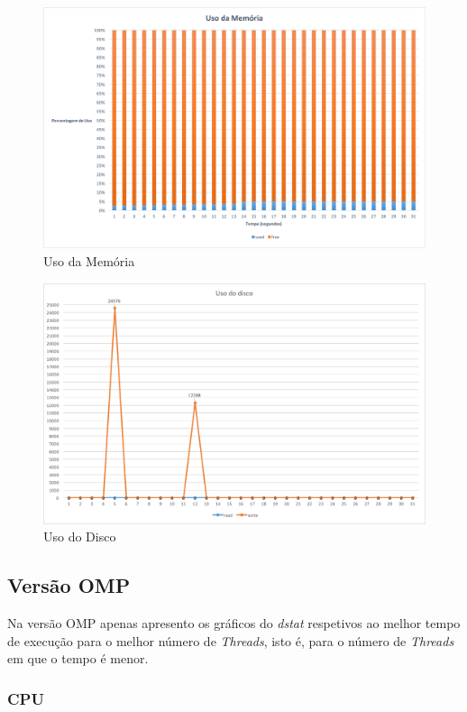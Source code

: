 \documentclass[conference,compsoc]{IEEEtran}
\begin{document}
\begin{figure}[h!]
\centering
\includegraphics[scale=0.325]{dstat/SER/dstat_seq_memoria.png}
\caption{Uso da Memória}
\label{fig:dstat_seq_memoria}
\end{figure}

\begin{figure}[h!]
\centering
\includegraphics[scale=0.325]{dstat/SER/dstat_seq_disco.png}
\caption{Uso do Disco}
\label{fig:dstat_seq_disco}
\end{figure}

\subsection{Versão OMP}
Na versão OMP apenas apresento os gráficos do \textit{dstat} respetivos ao melhor tempo de execução para o melhor número de \textit{Threads}, isto é, para o número de \textit{Threads} em que o tempo é menor.
\subsubsection{CPU}
\end{document}
